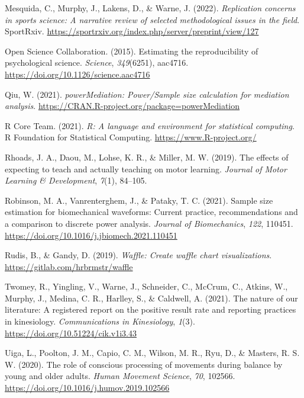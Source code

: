 \documentclass[
  man, donotrepeattitle,mask,floatsintext]{apa7}
\newlength{\cslhangindent}
\newlength{\cslentryspacingunit} %
\newenvironment{CSLReferences}[2] %
 {%
  \setlength{\parindent}{0pt}
  \ifodd #1
  \let\oldpar\par
  \def\par{\hangindent=\cslhangindent\oldpar}
  \fi
  \setlength{\parskip}{#2\cslentryspacingunit}
 }%
 {}
\begin{document}
\begin{CSLReferences}{1}{0}
\leavevmode{}%
Mesquida, C., Murphy, J., Lakens, D., \& Warne, J. (2022). \emph{Replication concerns in sports science: A narrative review of selected methodological issues in the field}. SportRxiv. \url{https://sportrxiv.org/index.php/server/preprint/view/127}

\leavevmode{}%
Open Science Collaboration. (2015). Estimating the reproducibility of psychological science. \emph{Science}, \emph{349}(6251), aac4716. \url{https://doi.org/10.1126/science.aac4716}

\leavevmode{}%
Qiu, W. (2021). \emph{{powerMediation}: Power/{Sample} size calculation for mediation analysis}. \url{https://CRAN.R-project.org/package=powerMediation}

\leavevmode{}%
R Core Team. (2021). \emph{R: A language and environment for statistical computing}. R Foundation for Statistical Computing. \url{https://www.R-project.org/}

\leavevmode{}%
Rhoads, J. A., Daou, M., Lohse, K. R., \& Miller, M. W. (2019). The effects of expecting to teach and actually teaching on motor learning. \emph{Journal of Motor Learning \& Development}, \emph{7}(1), 84--105.

\leavevmode{}%
Robinson, M. A., Vanrenterghem, J., \& Pataky, T. C. (2021). Sample size estimation for biomechanical waveforms: Current practice, recommendations and a comparison to discrete power analysis. \emph{Journal of Biomechanics}, \emph{122}, 110451. \url{https://doi.org/10.1016/j.jbiomech.2021.110451}

\leavevmode{}%
Rudis, B., \& Gandy, D. (2019). \emph{Waffle: Create waffle chart visualizations}. \url{https://gitlab.com/hrbrmstr/waffle}

\leavevmode{}%
Twomey, R., Yingling, V., Warne, J., Schneider, C., McCrum, C., Atkins, W., Murphy, J., Medina, C. R., Harlley, S., \& Caldwell, A. (2021). The nature of our literature: A registered report on the positive result rate and reporting practices in kinesiology. \emph{Communications in Kinesiology}, \emph{1}(3). \url{https://doi.org/10.51224/cik.v1i3.43}

\leavevmode{}%
Uiga, L., Poolton, J. M., Capio, C. M., Wilson, M. R., Ryu, D., \& Masters, R. S. W. (2020). The role of conscious processing of movements during balance by young and older adults. \emph{Human Movement Science}, \emph{70}, 102566. \url{https://doi.org/10.1016/j.humov.2019.102566}


\end{CSLReferences}
\end{document}
